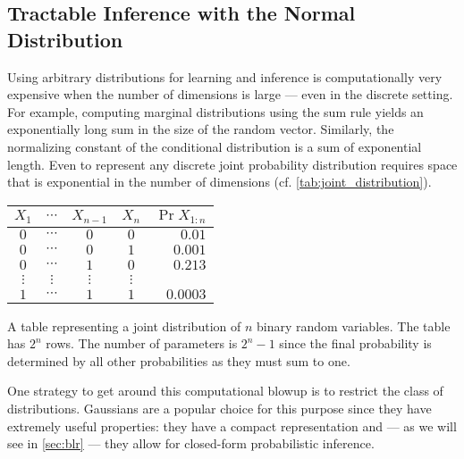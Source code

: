 \subsection{Tractable Inference with the Normal Distribution}\label{sec:fundamentals:gaussians}

Using arbitrary distributions for learning and inference is computationally very expensive when the number of dimensions is large --- even in the discrete setting.
For example, computing marginal distributions using the sum rule yields an exponentially long sum in the size of the random vector.
Similarly, the normalizing constant of the conditional distribution is a sum of exponential length.
Even to represent any discrete joint probability distribution requires space that is exponential in the number of dimensions (cf. \cref{tab:joint_distribution}).

\begin{marginfigure}
  \begin{tabular}{ccccr}
    \toprule
    $X_1$ & $\cdots$ & $X_{n-1}$ & $X_n$ & $\Pr{X_{1:n}}$ \\
    \midrule
    $0$ & $\cdots$ & $0$ & $0$ & $0.01$ \\
    $0$ & $\cdots$ & $0$ & $1$ & $0.001$ \\
    $0$ & $\cdots$ & $1$ & $0$ & $0.213$ \\
    $\vdots$ & $\vdots$ & $\vdots$ & $\vdots$ & \\
    $1$ & $\cdots$ & $1$ & $1$ & $0.0003$ \\
    \bottomrule
  \end{tabular}\vspace{1em}
  \caption{A table representing a joint distribution of $n$ binary random variables. The table has $2^n$ rows. The number of parameters is $2^n - 1$ since the final probability is determined by all other probabilities as they must sum to one.}\label{tab:joint_distribution}
\end{marginfigure}

One strategy to get around this computational blowup is to restrict the class of distributions.
Gaussians are a popular choice for this purpose since they have extremely useful properties: they have a compact representation and --- as we will see in \cref{sec:blr} --- they allow for closed-form probabilistic inference.

